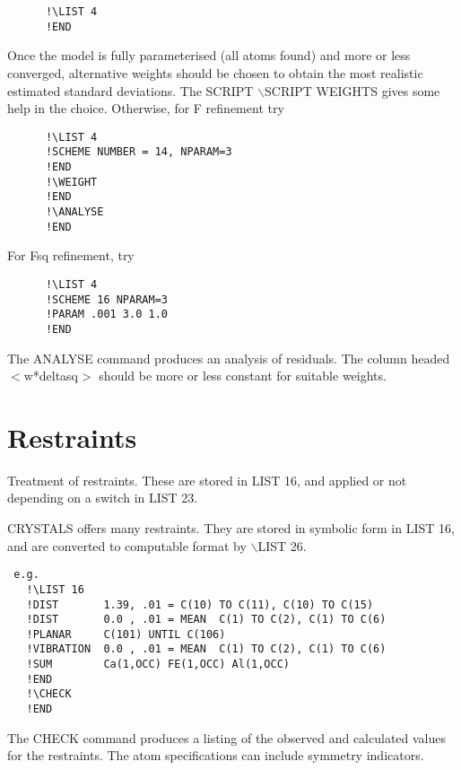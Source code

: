 \documentclass[10pt,a4paper]{report}
\begin{document}
\small\begin{verbatim}
      !\LIST 4
      !END
\end{verbatim}\normalsize



 Once the
 model is fully parameterised (all atoms found) and more or less converged,
 alternative weights should be chosen to obtain the most realistic estimated
 standard deviations. The SCRIPT $\backslash$SCRIPT WEIGHTS gives some help in the
 choice. Otherwise, for F refinement try

\small\begin{verbatim}
      !\LIST 4
      !SCHEME NUMBER = 14, NPARAM=3
      !END
      !\WEIGHT
      !END
      !\ANALYSE
      !END

\end{verbatim}\normalsize


For Fsq refinement, try

\small\begin{verbatim}
      !\LIST 4
      !SCHEME 16 NPARAM=3
      !PARAM .001 3.0 1.0
      !END
\end{verbatim}\normalsize




The ANALYSE command produces an analysis of residuals. The column headed
 $<$w*deltasq$>$ should be more or less constant for suitable weights.




\section{Restraints}


Treatment of restraints. These are stored in LIST 16, and applied or
 not depending on a switch in LIST 23.


CRYSTALS offers many restraints. They are stored in symbolic form in
 LIST 16, and are converted to computable format by $\backslash$LIST 26.

\small\begin{verbatim}
 e.g.
   !\LIST 16
   !DIST       1.39, .01 = C(10) TO C(11), C(10) TO C(15)
   !DIST       0.0 , .01 = MEAN  C(1) TO C(2), C(1) TO C(6)
   !PLANAR     C(101) UNTIL C(106)
   !VIBRATION  0.0 , .01 = MEAN  C(1) TO C(2), C(1) TO C(6)
   !SUM        Ca(1,OCC) FE(1,OCC) Al(1,OCC)
   !END
   !\CHECK
   !END
\end{verbatim}\normalsize


 The CHECK command produces a listing of the observed and calculated values
 for the restraints. The atom specifications can include symmetry
 indicators.
\end{document}
